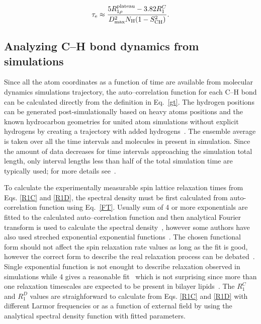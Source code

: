 \documentclass[aps,prl,superscriptaddress,twocolumn]{revtex4}
\begin{document}
\begin{equation}\label{ECT}
\tau_{\rm{e}}\approx\frac{5R_{1\rho}^{\rm{plateau}}-3.82R_1^C}{D_{\rm{max}}^2N_{\rm{H}}(1-S_{\rm{CH}}^2)}.
\end{equation} 


\subsection{Analyzing C--H bond dynamics from simulations}


Since all the atom coordinates as a function of time are available from molecular dynamics simulations trajectory,
the auto--correlation function for each C--H bond can be calculated directly from the definition in Eq.~\ref{gt}.
The hydrogen positions can be generated post-simulationally based on heavy atoms 
positions and the known hydrocarbon geometries for united atom simulations without explicit hydrogens 
by creating a trajectory with added hydrogens~\cite{lindahl01,wohlert06,ollila07a,ferreira15}. 
The ensemble average is taken over all the time intervals and molecules 
in present in simulation. Since the amount of data decreases for time intervals approaching the simulation total length,
only interval lengths less than half of the total simulation time are typically used; for more details see~\cite{gromacsMANUAL}.

To calculate the experimentally measurable spin lattice relaxation times from Eqs. \ref{R1C} and \ref{R1D}, 
the spectral density must be first calculated from auto-correlation function using Eq.~\ref{FT}. 
Usually sum of 4 or more exponentials are fitted to the calculated auto--correlation function and then 
analytical Fourier transform is used to calculate the spectral 
density~\cite{pastor88,venable93,pastor02,eldho03,ollila07a,ferreira15},
however some authors have also used streched exponential exponential functions~\cite{lindahl01,wohlert06}.
The chosen functional form should not affect the spin relaxation rate values as long as the fit is good, however 
the correct form to describe the real relaxation process can be debated~\cite{leftin11,wohlert06,edholm08,klauda08a,klauda08c}. 
Single exponential function is not enought to describe relaxation observed in simulations while 4 gives a reasonable 
fit~\cite{eldho03} which is not surprising since more than one relaxation timescales are expected to be present in bilayer
lipids~\cite{pastor88,venable93,pastor02,leftin11}. The $R_{1}^{C}$ and $R_{1}^{D}$ values are straighforward to
calculate from Eqs. \ref{R1C} and \ref{R1D} with different Larmor frequencies or as a function of external
field by using the analytical spectral density function with fitted parameters.
\end{document}
